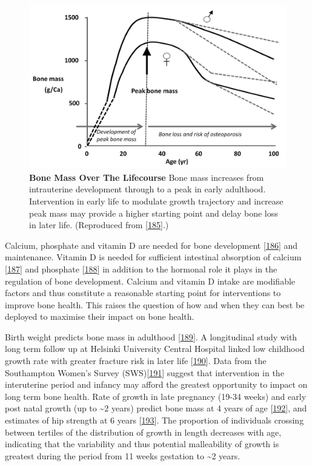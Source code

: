 \documentclass[
]{book}
\begin{document}
\begin{figure}

{\centering \includegraphics[width=0.8\linewidth]{figs/Harvey2014bfig1} 

}

\caption{\textbf{Bone Mass Over The Lifecourse} Bone mass increases from intrauterine development through to a peak in early adulthood. Intervention in early life to modulate growth trajectory and increase peak mass may provide a higher starting point and delay bone loss in later life. (Reproduced from {[}\protect\hyperlink{ref-Harvey2014b}{185}{]}.)}\label{fig:Harvey2014bfig1}
\end{figure}



Calcium, phosphate and vitamin D are needed for bone development {[}\protect\hyperlink{ref-Bikle2012}{186}{]} and maintenance.
Vitamin D is needed for sufficient intestinal absorption of calcium {[}\protect\hyperlink{ref-Christakos2011}{187}{]} and phosphate {[}\protect\hyperlink{ref-Fukumoto2014}{188}{]} in addition to the hormonal role it plays in the regulation of bone development.
Calcium and vitamin D intake are modifiable factors and thus constitute a reasonable starting point for interventions to improve bone health.
This raises the question of how and when they can best be deployed to maximise their impact on bone health.

Birth weight predicts bone mass in adulthood {[}\protect\hyperlink{ref-Baird2011}{189}{]}.
A longitudinal study with long term follow up at Helsinki University Central Hospital linked low childhood growth rate with greater fracture risk in later life {[}\protect\hyperlink{ref-Cooper2001}{190}{]}.
Data from the Southampton Women's Survey (SWS){[}\protect\hyperlink{ref-Inskip2006}{191}{]} suggest that intervention in the interuterine period and infancy may afford the greatest opportunity to impact on long term bone health.
Rate of growth in late pregnancy (19-34 weeks) and early post natal growth (up to \textasciitilde2 years) predict bone mass at 4 years of age {[}\protect\hyperlink{ref-Harvey2010a}{192}{]}, and estimates of hip strength at 6 years {[}\protect\hyperlink{ref-Harvey2013}{193}{]}.
The proportion of individuals crossing between tertiles of the distribution of growth in length decreases with age, indicating that the variability and thus potential malleability of growth is greatest during the period from 11 weeks gestation to \textasciitilde2 years.
\end{document}
